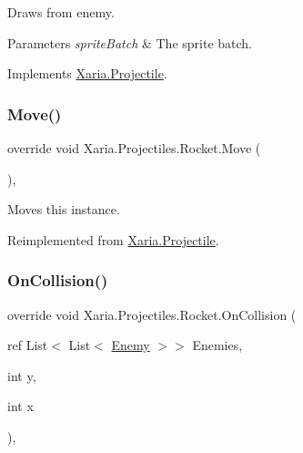 Draws from enemy. 


\begin{DoxyParams}{Parameters}
{\em sprite\+Batch} & The sprite batch.\\
\hline
\end{DoxyParams}


Implements \hyperlink{classXaria_1_1Projectile_a92b00c404863fc5ef875fb598345bcbc}{Xaria.\+Projectile}.

\mbox{\label{classXaria_1_1Projectiles_1_1Rocket_a6f9beb147ddfbac24227ecb80fdbc71e}} 
\subsubsection{\texorpdfstring{Move()}{Move()}}
{\footnotesize\ttfamily override void Xaria.\+Projectiles.\+Rocket.\+Move (\begin{DoxyParamCaption}{ }\end{DoxyParamCaption})\hspace{0.3cm}{\ttfamily [inline]}, {\ttfamily [virtual]}}



Moves this instance. 



Reimplemented from \hyperlink{classXaria_1_1Projectile_a7ac9f22571f1bb0059e684f1cb755559}{Xaria.\+Projectile}.

\mbox{\label{classXaria_1_1Projectiles_1_1Rocket_ae3a599ad8ab26ae2757e1c5948c752ac}} 
\subsubsection{\texorpdfstring{On\+Collision()}{OnCollision()}\hspace{0.1cm}{\footnotesize\ttfamily [1/2]}}
{\footnotesize\ttfamily override void Xaria.\+Projectiles.\+Rocket.\+On\+Collision (\begin{DoxyParamCaption}\item[{ref List$<$ List$<$ \hyperlink{classXaria_1_1Enemy}{Enemy} $>$$>$}]{Enemies,  }\item[{int}]{y,  }\item[{int}]{x }\end{DoxyParamCaption})\hspace{0.3cm}{\ttfamily [inline]}, {\ttfamily [virtual]}}



